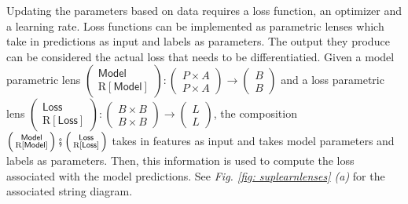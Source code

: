 \documentclass[11pt,a4paper,openright,twoside]{report}
\theoremstyle{plain}
\theoremstyle{definition}
\begin{document}
Updating the parameters based on data requires a loss function, an optimizer and a learning rate. Loss functions can be implemented as parametric lenses which take in predictions as input and labels as parameters. The output they produce can be considered the actual loss that needs to be differentiatied. Given a model parametric lens $\left(\begin{smallmatrix} \mathsf{Model} \\ \mathrm{R}[\mathsf{Model}] \end{smallmatrix}\right):\left(\begin{smallmatrix} P \times A \\ P \times A \end{smallmatrix}\right) \to \left(\begin{smallmatrix} B \\ B \end{smallmatrix}\right)$ and a loss parametric lens $\left(\begin{smallmatrix} \mathsf{Loss} \\ \mathrm{R}[\mathsf{Loss}] \end{smallmatrix}\right):\left(\begin{smallmatrix} B \times B\\ B \times B \end{smallmatrix}\right) \to \left(\begin{smallmatrix} L \\ L \end{smallmatrix}\right)$, the composition $\left(\begin{smallmatrix} \mathsf{Model} \\ \mathrm{R}[\mathsf{Model}] \end{smallmatrix}\right) \fatsemi \left(\begin{smallmatrix} \mathsf{Loss} \\ \mathrm{R}[\mathsf{Loss}] \end{smallmatrix}\right)$ takes in features as input and takes model parameters and labels as parameters. Then, this information is used to compute the loss associated with the model predictions. See \textit{Fig. \ref{fig: suplearnlenses} (a)} for the associated string diagram.
\end{document}
